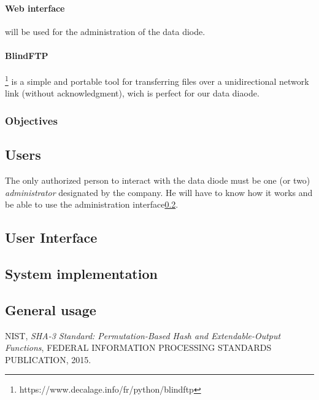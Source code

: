 \documentclass[a4paper,10pt]{article}
\begin{document}
\paragraph{Web interface} will be used for the administration of the data diode.

\paragraph{BlindFTP}\footnote{https://www.decalage.info/fr/python/blindftp} is a simple and portable tool for transferring files over a unidirectional network link (without acknowledgment), wich is perfect for our data diaode.

\subsubsection{Objectives}
\subsection{Users} 
The only authorized person to interact with the data diode must be one (or two) \textit{administrator} designated by the company. He will have to know how it works and be able to use the administration interface\ref{UI}.
\subsection{User Interface}\label{UI}

\subsection{System implementation}
\subsection{General usage}


\begin{thebibliography}{9}

NIST,
\textit{SHA-3 Standard: Permutation-Based Hash and Extendable-Output Functions},
FEDERAL INFORMATION PROCESSING STANDARDS PUBLICATION,
2015.

\end{thebibliography}
\end{document}
